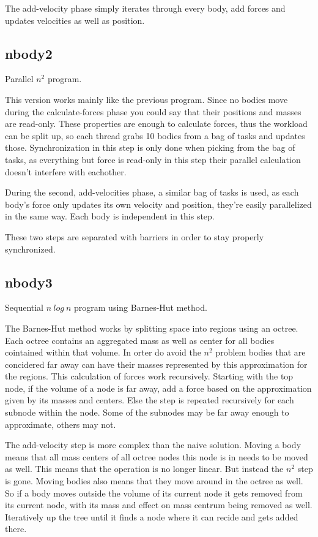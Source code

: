 \documentclass[a4paper] {article}
\begin{document}
The add-velocity phase simply iterates through every body, add forces and updates velocities as well as position.

\subsection{nbody2}

Parallel $n^2$ program.

This version works mainly like the previous program. Since no bodies move during the calculate-forces phase you could say that their positions and masses are read-only. These properties are enough to calculate forces, thus the workload can be split up, so each thread grabs 10 bodies from a bag of tasks and updates those. Synchronization in this step is only done when picking from the bag of tasks, as everything but force is read-only in this step their parallel calculation doesn't interfere with eachother.

During the second, add-velocities phase, a similar bag of tasks is used, as each body's force only updates its own velocity and position, they're easily parallelized in the same way. Each body is independent in this step.

These two steps are separated with barriers in order to stay properly synchronized.

\subsection{nbody3}

Sequential $n\ log\ n$ program using Barnes-Hut method.

The Barnes-Hut method works by splitting space into regions using an octree. Each octree contains an aggregated mass as well as center for all bodies cointained within that volume. In orter do avoid the $n^2$ problem bodies that are concidered far away can have their masses represented by this approximation for the regions. This calculation of forces work recursively. Starting with the top node, if the volume of a node is far away, add a force based on the approximation given by its masses and centers. Else the step is repeated recursively for each subnode within the node. Some of the subnodes may be far away enough to approximate, others may not.

The add-velocity step is more complex than the naive solution. Moving a body means that all mass centers of all octree nodes this node is in needs to be moved as well. This means that the operation is no longer linear. But instead the $n^2$ step is gone. Moving bodies also means that they move around in the octree as well. So if a body moves outside the volume of its current node it gets removed from its current node, with its mass and effect on mass centrum being removed as well. Iteratively up the tree until it finds a node where it can recide and gets added there.
\end{document}
